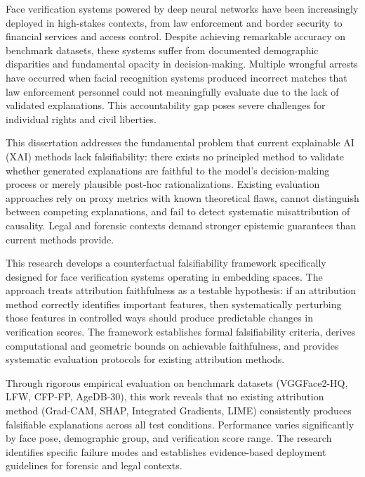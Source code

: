 
Face verification systems powered by deep neural networks have been increasingly deployed in high-stakes contexts, from law enforcement and border security to financial services and access control. Despite achieving remarkable accuracy on benchmark datasets, these systems suffer from documented demographic disparities and fundamental opacity in decision-making. Multiple wrongful arrests have occurred when facial recognition systems produced incorrect matches that law enforcement personnel could not meaningfully evaluate due to the lack of validated explanations. This accountability gap poses severe challenges for individual rights and civil liberties.

This dissertation addresses the fundamental problem that current explainable AI (XAI) methods lack falsifiability: there exists no principled method to validate whether generated explanations are faithful to the model's decision-making process or merely plausible post-hoc rationalizations. Existing evaluation approaches rely on proxy metrics with known theoretical flaws, cannot distinguish between competing explanations, and fail to detect systematic misattribution of causality. Legal and forensic contexts demand stronger epistemic guarantees than current methods provide.

This research develops a counterfactual falsifiability framework specifically designed for face verification systems operating in embedding spaces. The approach treats attribution faithfulness as a testable hypothesis: if an attribution method correctly identifies important features, then systematically perturbing those features in controlled ways should produce predictable changes in verification scores. The framework establishes formal falsifiability criteria, derives computational and geometric bounds on achievable faithfulness, and provides systematic evaluation protocols for existing attribution methods.

Through rigorous empirical evaluation on benchmark datasets (VGGFace2-HQ, LFW, CFP-FP, AgeDB-30), this work reveals that no existing attribution method (Grad-CAM, SHAP, Integrated Gradients, LIME) consistently produces falsifiable explanations across all test conditions. Performance varies significantly by face pose, demographic group, and verification score range. The research identifies specific failure modes and establishes evidence-based deployment guidelines for forensic and legal contexts.

